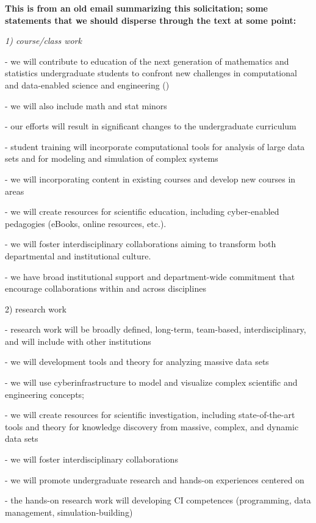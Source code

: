 {\bf This is from an old email summarizing this solicitation; some
statements that we should disperse through the text at some point:} 

{\it 
1) course/class work 

- we will contribute to education of the next generation of mathematics and statistics 
   undergraduate students to confront new challenges in computational and data-enabled 
   science and engineering (\cdse) 

- we will also include math and stat minors 

- our efforts will result in significant changes to the undergraduate curriculum

- student training will incorporate computational tools for analysis of large data sets and
   for modeling and simulation of complex systems

- we will incorporating \cdse content in existing courses and develop new courses in 
   \cdse areas

- we will create resources for scientific education, including cyber-enabled pedagogies 
   (eBooks, online resources, etc.).

- we will foster interdisciplinary collaborations aiming to transform both departmental and 
   institutional culture.

- we have broad institutional support and department-wide commitment that encourage 
   collaborations within and across disciplines


2) research work

- research work will be broadly defined, long-term, team-based, interdisciplinary, and 
   will include with other institutions 

- we will development tools and theory for analyzing massive data sets

- we will use cyberinfrastructure to model and visualize complex scientific and engineering 
   concepts;

- we will create resources for scientific investigation, including state-of-the-art tools and 
  theory for knowledge discovery from massive, complex, and dynamic data sets

- we will foster interdisciplinary collaborations

- we will promote undergraduate research and hands-on experiences centered on \cdse

- the hands-on research work will developing CI competences (programming, data 
   management, simulation-building)

}
